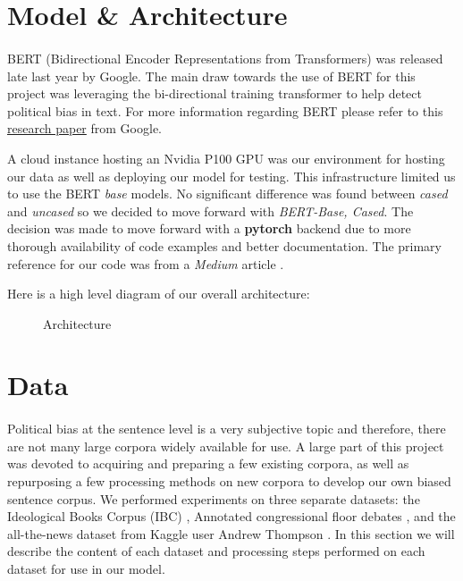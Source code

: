 \documentclass[10pt,a4paper,onecolumn]{article}
\begin{document}
\section{Model \& Architecture}
\paragraph{}
BERT (Bidirectional Encoder Representations from Transformers) was released late last year by Google. The main draw towards the use of BERT for this project was leveraging the bi-directional training transformer to help detect political bias in text. For more information regarding BERT please refer to this \href{https://arxiv.org/abs/1810.04805}{research paper} from Google.

A cloud instance hosting an Nvidia P100 GPU was our environment for hosting our data as well as deploying our model for testing. This infrastructure limited us to use the BERT \textit{base} models. No significant difference was found between \textit{cased} and \textit{uncased} so we decided to move forward with \textit{BERT-Base, Cased}. The decision was made to move forward with a \textbf{pytorch} backend due to more thorough availability of code examples and better documentation. The primary reference for our code was from a \textit{Medium} article \cite{usingbert}.

Here is a high level diagram of our overall architecture:
\begin{figure}
  \caption{Architecture}
  \label{fig:architecture}
\end{figure}

\newpage

\section{Data}
\label{sec:data}
\paragraph{}
Political bias at the sentence level is a very subjective topic and therefore, there are not many large corpora widely available for use. A large part of this project was devoted to acquiring and preparing a few existing corpora, as well as repurposing a few processing methods on new corpora to develop our own biased sentence corpus. We performed experiments on three separate datasets: the Ideological Books Corpus (IBC) \cite{iyyerRNN}, Annotated congressional floor debates \cite{convote}, and the all-the-news dataset from Kaggle user Andrew Thompson \cite{news}. In this section we will describe the content of each dataset and processing steps performed on each dataset for use in our model.
\end{document}
